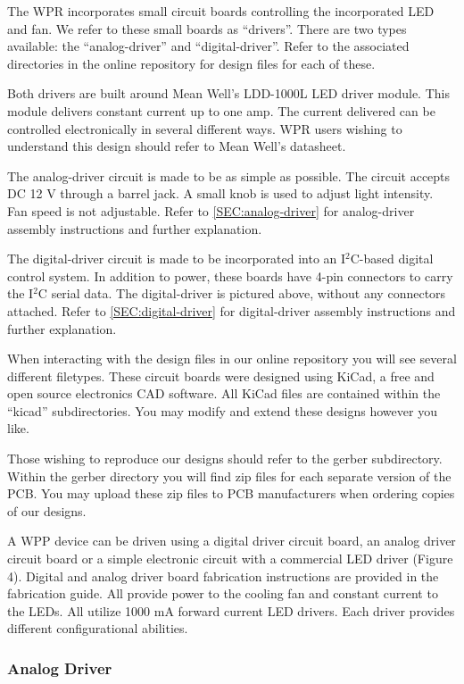 \documentclass[11pt]{article}
\begin{document}
The WPR incorporates small circuit boards controlling the incorporated LED and fan.
We refer to these small boards as ``drivers''.
There are two types available: the ``analog-driver'' and ``digital-driver''.
Refer to the associated directories in the online repository for design files for each of these.

Both drivers are built around Mean Well's LDD-1000L LED driver module.
This module delivers constant current up to one amp.
The current delivered can be controlled electronically in several different ways.
WPR users wishing to understand this design should refer to Mean Well's datasheet.

The analog-driver circuit is made to be as simple as possible.
The circuit accepts DC 12 V through a barrel jack.
A small knob is used to adjust light intensity.
Fan speed is not adjustable.
Refer to \autoref{SEC:analog-driver} for analog-driver assembly instructions and further explanation.

The digital-driver circuit is made to be incorporated into an I$^2$C-based digital control system.
In addition to power, these boards have 4-pin connectors to carry the I$^2$C serial data.
The digital-driver is pictured above, without any connectors attached.
Refer to \autoref{SEC:digital-driver} for digital-driver assembly instructions and further explanation.

When interacting with the design files in our online repository you will see several different filetypes.
These circuit boards were designed using KiCad, a free and open source electronics CAD software.
All KiCad files are contained within the ``kicad'' subdirectories.
You may modify and extend these designs however you like.

Those wishing to reproduce our designs should refer to the gerber subdirectory.
Within the gerber directory you will find zip files for each separate version of the PCB.
You may upload these zip files to PCB manufacturers when ordering copies of our designs.

A WPP device can be driven using a digital driver circuit board, an analog driver circuit board or a simple electronic circuit with a commercial LED driver (Figure 4).
Digital and analog driver board fabrication instructions are provided in the fabrication guide.
All provide power to the cooling fan and constant current to the LEDs.
All utilize 1000 mA forward current LED drivers. Each driver provides different configurational abilities.

\clearpage
\subsubsection{Analog Driver} \label{SEC:analog-driver}
\end{document}
